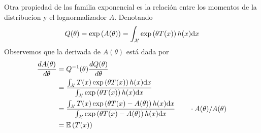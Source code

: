 Otra propiedad de las familia exponencial es la relación entre los momentos de la distribucion y el lognormalizador $A$. Denotando
\begin{equation}
	Q(\theta) =\exp\left(A(\theta)\right) = \int_{\mathcal X} \exp\left(\theta T (x)\right)h(x){\text{d}x}
\end{equation}
Observemos que la derivada de $A(\theta)$ está dada por 
\begin{align}
	\frac{dA(\theta)}{d\theta} &= Q^{-1}(\theta)\frac{d Q(\theta)}{d\theta} \\ 
	&= \frac{\int_{\mathcal X} T (x) \exp\left(\theta T (x)\right)h(x){\text{d}x}}{\int_{\mathcal X} \exp\left(\theta T (x)\right)h(x){\text{d}x}} \nonumber\\
	&= \frac{\int_{\mathcal X} T (x) \exp\left(\theta T (x) -A(\theta)\right)h(x){\text{d}x}}{\int_{\mathcal X} \exp\left(\theta T (x)-A(\theta) \right)h(x){\text{d}x}} \quad\quad \cdot  A(\theta)/A(\theta) \nonumber\\
	&=\mathbb{E} \left(T(x)\right)  \nonumber
\end{align}


